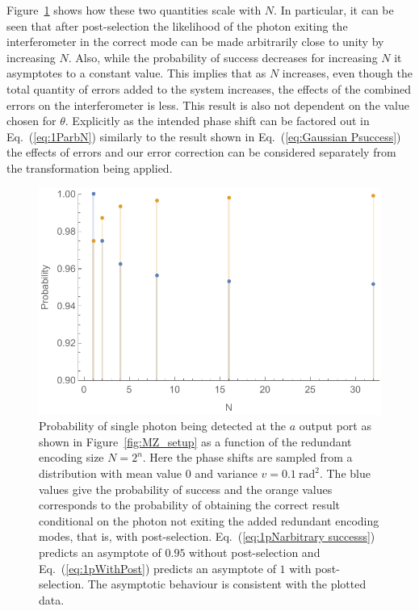 \documentclass[aps,pra,twocolumn,superscriptaddress,numerical,floatfix]{revtex4-1}
\begin{document}
Figure~\ref{fig:post vs no post} shows how these two quantities scale with $N$. In particular, it can be seen that after post-selection the likelihood of the photon exiting the interferometer in the correct mode can be made arbitrarily close to unity by increasing $N$. Also, while the probability of success decreases for increasing $N$ it asymptotes to a constant value. This implies that as $N$ increases, even though the total quantity of errors added to the system increases, the effects of the combined errors on the interferometer is less. This result is also not dependent on the value chosen for $\theta$. Explicitly as the intended phase shift can be factored out in Eq.~(\ref{eq:1ParbN}) similarly to the result shown in Eq.~(\ref{eq:Gaussian Psuccess}) the effects of errors and our error correction can be considered separately from the transformation being applied.
\begin{figure}[tbh]
	\includegraphics[width=\columnwidth]{1photonpostvsnopost.pdf}
	\caption{\label{fig:post vs no post} Probability of single photon being detected at the $a$ output port as shown in Figure~\ref{fig:MZ_setup} as a function of the redundant encoding size $N=2^n$. Here the phase shifts are sampled from a distribution with mean value $0$ and variance $v=0.1\ \textrm{rad}^{2}$. The blue values give the probability of success and the orange values corresponds to the probability of obtaining the correct result conditional on the photon not exiting the added redundant encoding modes, that is, with post-selection.  Eq.~(\ref{eq:1pNarbitrary successs}) predicts an asymptote of $0.95$ without post-selection and Eq.~(\ref{eq:1pWithPost}) predicts an asymptote of $1$ with post-selection.  The asymptotic behaviour is consistent with the plotted data.}
\end{figure}
\end{document}
